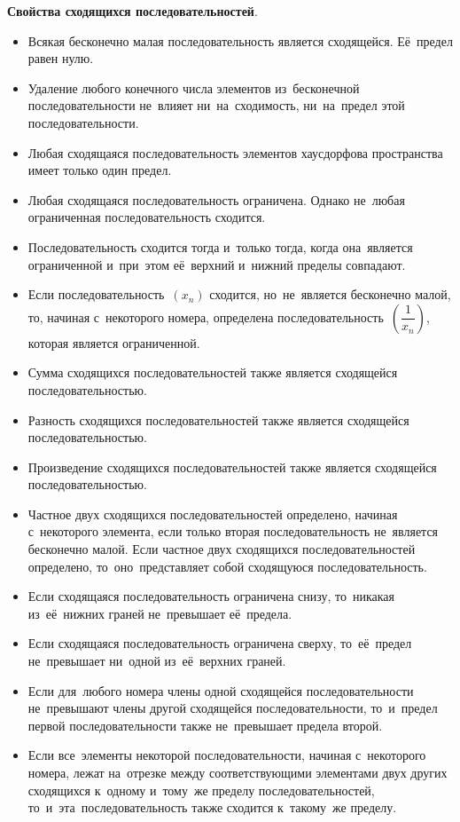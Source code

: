 \documentclass[]{scrartcl}
\begin{document}
{{\textbf{Свойства сходящихся последовательностей}.
\begin{itemize}
	\item Всякая бесконечно малая последовательность является сходящейся. Её~предел равен нулю.
	\item Удаление любого конечного числа элементов из~бесконечной последовательности не~влияет ни~на~сходимость, ни~на~предел этой последовательности.
	\item Любая сходящаяся последовательность элементов хаусдорфова пространства имеет только один предел.
	\item Любая сходящаяся последовательность ограничена. Однако не~любая ограниченная последовательность сходится.
	\item Последовательность сходится тогда и~только тогда, когда она~является ограниченной и~при~этом её~верхний и~нижний пределы совпадают.
	\item Если последовательность~${\textstyle (x_{n})}$ сходится, но~не~является бесконечно малой, то, начиная с~некоторого номера, определена последовательность~${\textstyle (\dfrac{1}{x_n})}$, которая является ограниченной.
	\item Сумма сходящихся последовательностей также является сходящейся последовательностью.
	\item Разность сходящихся последовательностей также является сходящейся последовательностью.
	\item Произведение сходящихся последовательностей также является сходящейся последовательностью.
	\item Частное двух сходящихся последовательностей определено, начиная с~некоторого элемента, если только вторая последовательность не~является бесконечно малой. Если частное двух сходящихся последовательностей определено, то~оно~представляет собой сходящуюся последовательность.
	\item Если сходящаяся последовательность ограничена снизу, то~никакая из~её~нижних граней не~превышает её~предела.
	\item Если сходящаяся последовательность ограничена сверху, то~её~предел не~превышает ни~одной из~её~верхних граней.
	\item Если для~любого номера члены одной сходящейся последовательности не~превышают члены другой сходящейся последовательности, то~и~предел первой последовательности также не~превышает предела второй.
	\item Если все~элементы некоторой последовательности, начиная с~некоторого номера, лежат на~отрезке между соответствующими элементами двух других сходящихся к~одному и~тому~же пределу последовательностей, то~и~эта~последовательность также сходится к~такому~же пределу.

\end{itemize}}}
\end{document}
